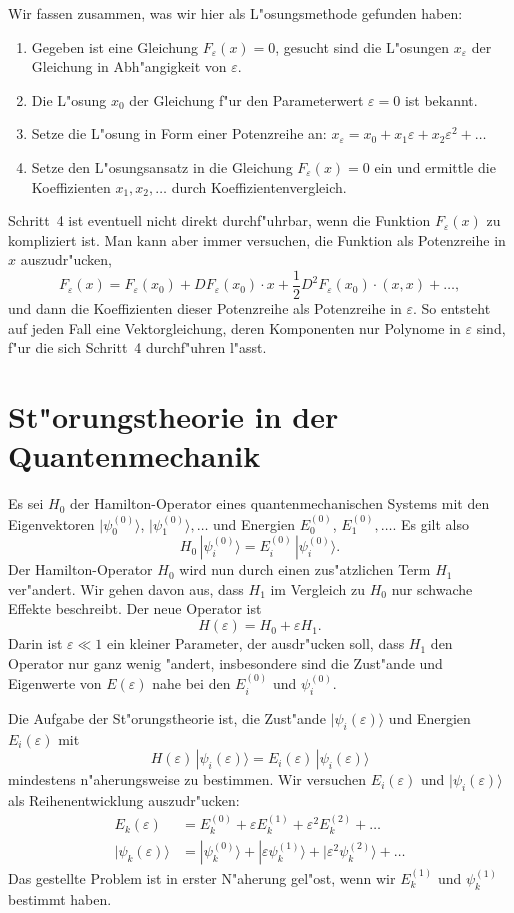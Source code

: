Wir fassen zusammen, was wir hier als L"osungsmethode gefunden haben:
\begin{enumerate}
\item Gegeben ist eine Gleichung $F_\varepsilon(x)=0$, gesucht
sind die L"osungen $x_\varepsilon$ der Gleichung in Abh"angigkeit von
$\varepsilon$.
\item Die L"osung $x_0$ der Gleichung f"ur den Parameterwert $\varepsilon=0$
ist bekannt.
\item Setze die L"osung in Form einer Potenzreihe an:
$x_\varepsilon = x_0+x_1\varepsilon+x_2\varepsilon^2+\dots$
\item Setze den L"osungsansatz in die Gleichung $F_\varepsilon(x)=0$ ein
und ermittle die Koeffizienten $x_1,x_2,\dots$ durch Koeffizientenvergleich.
\end{enumerate}
Schritt~4 ist eventuell nicht direkt durchf"uhrbar, wenn die Funktion
$F_\varepsilon(x)$ zu kompliziert ist. Man kann aber immer versuchen, die
Funktion als Potenzreihe in $x$ auszudr"ucken, 
\[
F_\varepsilon(x)=F_\varepsilon(x_0) + DF_\varepsilon(x_0)\cdot x
+ \frac12 D^2F_\varepsilon(x_0)\cdot(x,x)+\dots,
\]
und dann die Koeffizienten dieser Potenzreihe als Potenzreihe in $\varepsilon$.
So entsteht auf jeden Fall eine Vektorgleichung, deren Komponenten nur
Polynome in $\varepsilon$ sind, f"ur die sich Schritt~4 durchf"uhren l"asst.

\section{St"orungstheorie in der Quantenmechanik}
Es sei $H_0$ der Hamilton-Operator eines quantenmechanischen Systems
mit den Eigenvektoren $|\psi_0^{(0)}\rangle$, $|\psi_1^{(0)}\rangle,\dots$
und Energien
$E_0^{(0)}$, $E_1^{(0)},\dots$.
Es gilt also 
\[
H_0\,|\psi_i^{(0)}\rangle = E_i^{(0)}\,|\psi_i^{(0)}\rangle.
\]
Der Hamilton-Operator $H_0$ wird nun durch einen zus"atzlichen Term
$H_1$ ver"andert. Wir gehen davon aus, dass $H_1$ im Vergleich zu
$H_0$ nur schwache Effekte beschreibt. Der neue Operator ist
\[
H(\varepsilon)=H_0+\varepsilon H_1.
\]
Darin ist $\varepsilon\ll 1$ ein kleiner Parameter, der ausdr"ucken
soll, dass $H_1$ den Operator nur ganz wenig "andert, insbesondere
sind die Zust"ande und Eigenwerte von $E(\varepsilon)$ nahe bei 
den $E_i^{(0)}$ und $\psi_i^{(0)}$.

Die Aufgabe der St"orungstheorie ist, die Zust"ande
$|\psi_i(\varepsilon)\rangle$
und Energien $E_i(\varepsilon)$ mit
\[
H(\varepsilon)\,|\psi_i(\varepsilon)\rangle
=
E_i(\varepsilon)\,|\psi_i(\varepsilon)\rangle
\]
mindestens n"aherungsweise zu bestimmen.
Wir versuchen $E_i(\varepsilon)$ und $|\psi_i(\varepsilon)\rangle$ als
Reihenentwicklung auszudr"ucken:
\begin{align*}
E_k(\varepsilon)
&=
E_k^{(0)}+\varepsilon E_k^{(1)} + \varepsilon^2 E_k^{(2)}+\dots
\\
|\psi_k(\varepsilon)\rangle
&=
|\psi_k^{(0)}\rangle+|\varepsilon\psi_k^{(1)}\rangle
+|\varepsilon^2\psi_k^{(2)}\rangle+\dots
\end{align*}
Das gestellte Problem ist in erster N"aherung gel"ost, wenn wir $E_k^{(1)}$
und $\psi_k^{(1)}$ bestimmt haben.

